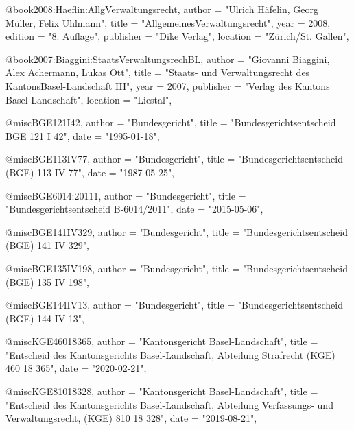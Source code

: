 @book{2008:Haeflin:AllgVerwaltungsrecht,
	author = "Ulrich Häfelin, Georg Müller, Felix Uhlmann",
	title = "AllgemeinesVerwaltungsrecht",
	year = 2008,
	edition = "8. Auflage",
	publisher = "Dike Verlag",
	location = "Zürich/St. Gallen",
}


@book{2007:Biaggini:StaatsVerwaltungsrechBL,
	author = "Giovanni Biaggini, Alex Achermann, Lukas Ott",
	title = "Staats- und Verwaltungsrecht des KantonsBasel-Landschaft III",
	year = 2007,
	publisher = "Verlag des Kantons Basel-Landschaft",
	location = "Liestal",
}


@misc{BGE121I42,
	author = "Bundesgericht",
	title = "Bundesgerichtsentscheid BGE 121 I 42",
	date = "1995-01-18",
}

@misc{BGE113IV77,
	author = "Bundesgericht",
	title = "Bundesgerichtsentscheid  (BGE) 113 IV 77",
	date = "1987-05-25",
}

@misc{BGE6014:20111,
	author = "Bundesgericht",
	title = "Bundesgerichtsentscheid B-6014/2011",
	date = "2015-05-06",
}

@misc{BGE141IV329,
	author = "Bundesgericht",
	title = "Bundesgerichtsentscheid  (BGE) 141 IV 329",
}

@misc{BGE135IV198,
	author = "Bundesgericht",
	title = "Bundesgerichtsentscheid  (BGE) 135 IV 198",
}

@misc{BGE144IV13,
	author = "Bundesgericht",
	title = "Bundesgerichtsentscheid  (BGE) 144 IV 13",
}



@misc{KGE46018365,
	author = "Kantonsgericht Basel-Landschaft",
	title = "Entscheid des Kantonsgerichts Basel-Landschaft, Abteilung Strafrecht (KGE) 460 18 365",
	date = "2020-02-21",
}

@misc{KGE81018328,
	author = "Kantonsgericht Basel-Landschaft",
	title = "Entscheid des Kantonsgerichts Basel-Landschaft, Abteilung Verfassungs- und
	Verwaltungsrecht, (KGE) 810 18 328",
	date = "2019-08-21",
}
